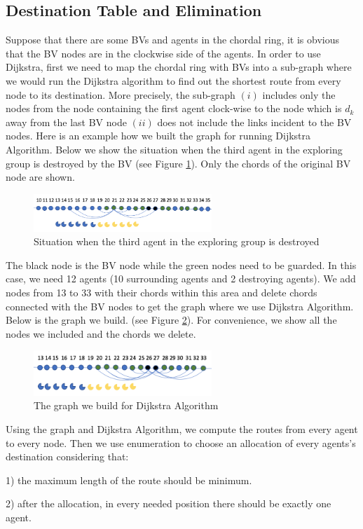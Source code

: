 \subsection{Destination Table and Elimination}
Suppose that there are some BVs and agents in the chordal ring, it is obvious that the BV nodes are in the clockwise side of the agents. In order to use Dijkstra, first we need to map the chordal ring with BVs into a sub-graph where we would run the Dijkstra algorithm to find out the shortest route from every node to its destination. More precisely, the sub-graph $(i)$ includes only the nodes from the node containing the first agent clock-wise  to the node which is $d_k$ away from the last BV node $(ii)$ does not include  the links  incident to   the BV nodes.
Here is an example how we built the graph for running Dijkstra Algorithm. Below we show the situation when the third agent in the exploring group is destroyed by the BV (see Figure \ref{fig:D1}). Only the chords of the original BV node are shown. 
\begin{figure}[H]
  \centering  
  \includegraphics[width=0.6\textwidth]{figures/D1.png}
  \caption{Situation when the third agent in the exploring group is destroyed}\label{fig:D1}
\end{figure} 

The black node is the BV node while the green nodes need to be guarded. In this case, we need 12 agents (10 surrounding agents and 2 destroying agents). 
We add nodes from 13 to 33 with their chords within this area and delete chords connected with the BV nodes to get the graph where we use Dijkstra Algorithm. Below is the graph we build. (see Figure  \ref{fig:D2}). For convenience, we show   all the nodes we included and the chords we delete.
\begin{figure}[H]
  \centering  
  \includegraphics[width=0.6\textwidth]{figures/D2.png}
  \caption{The graph we build for Dijkstra Algorithm}\label{fig:D2}
\end{figure} 
Using the graph and Dijkstra Algorithm, we compute the routes from every agent to every node. Then we use enumeration to choose an allocation of every agents's destination considering that: 
\begin{description}
\item 1) the maximum length of the route should be minimum. 
\item 2) after the allocation, in every needed position there should be exactly one agent.
\end{description}
 
